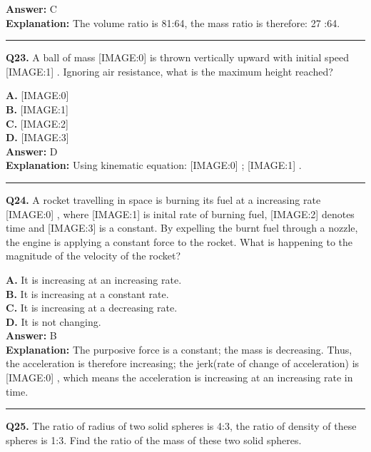 \documentclass[12pt]{article}
\begin{document}
\textbf{Answer:} C \\
\textbf{Explanation:} The volume ratio is 81:64, the mass ratio is therefore: 27 :64.

\hrule
\vspace{1em}


\noindent
\textbf{Q23.} A ball of mass
[IMAGE:0]
is thrown vertically upward with initial speed
[IMAGE:1]
. Ignoring air resistance, what is the maximum height reached?



\textbf{A.} [IMAGE:0] \\
\textbf{B.} [IMAGE:1] \\
\textbf{C.} [IMAGE:2] \\
\textbf{D.} [IMAGE:3] \\

\textbf{Answer:} D \\
\textbf{Explanation:} Using kinematic equation:
[IMAGE:0]
;
[IMAGE:1]
.

\hrule
\vspace{1em}


\noindent
\textbf{Q24.} A rocket travelling in space is burning its fuel at a increasing rate
[IMAGE:0]
, where
[IMAGE:1]
is inital rate of burning fuel,
[IMAGE:2]
denotes time and
[IMAGE:3]
is a constant. By expelling the burnt fuel through a nozzle, the engine is applying a constant force to the rocket.
What is happening to the magnitude of the velocity of the rocket?



\textbf{A.} It is increasing at an increasing rate. \\
\textbf{B.} It is increasing at a constant rate. \\
\textbf{C.} It is increasing at a decreasing rate. \\
\textbf{D.} It is not changing. \\

\textbf{Answer:} B \\
\textbf{Explanation:} The purposive force is a constant; the mass is decreasing.
Thus, the acceleration is therefore increasing;
the jerk(rate of change of acceleration) is
[IMAGE:0]
, which means the acceleration is increasing at an increasing rate in time.

\hrule
\vspace{1em}


\noindent
\textbf{Q25.} The ratio of radius of two solid spheres is 4:3, the ratio of density of these spheres is 1:3. Find the ratio of the mass of these two solid spheres.
\end{document}
